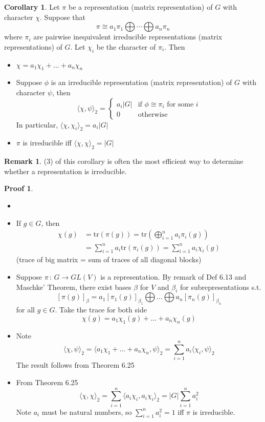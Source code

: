 \documentclass{book}
\newcommand{\inner}[1]{\langle #1 \rangle}
\newcommand{\abs}[1]{\lvert #1 \rvert }
\newcommand{\tr}[1]{\textrm{tr}( #1 )}
\theoremstyle{definition}
\newtheorem{corollary}[lemma]{Corollary}
\theoremstyle{remarkstyle}
\newtheorem*{remark}{Remark}%
\newtheorem*{myproof}{Proof}%
\begin{document}
\begin{corollary}
    Let $\pi$ be a representation (matrix representation) of $G$ with character $\chi$. Suppose that 
    $$
    \pi \cong a_1\pi_1 \bigoplus \cdots \bigoplus a_n\pi_n
    $$
    where $\pi_i$ are pairwise inequivalent irreducible representations (matrix representations) of $G$. Let $\chi_i$ be the character of $\pi_i$. Then 
    \begin{itemize}
        \item $\chi=a_1\chi_1+\dots+a_n\chi_n$
        \item Suppose $\phi$ is an irreducible representation (matrix representation) of $G$ with character $\psi$, then 
        $$
        \inner{\chi,\psi}_2 = \left\{
        \begin{array}{ll}
            a_i\abs{G} & \textrm{if $\phi\cong\pi_i$ for some $i$}  \\
            0 & \textrm{otherwise} 
        \end{array}
        \right.
        $$
        In particular, $\inner{\chi,\chi_i}_2=a_i\abs{G}$
        \item $\pi$ is irreducible iff $\inner{\chi,\chi}_2=\abs{G}$
    \end{itemize}
\end{corollary}
\begin{remark}
    (3) of this corollary is often the most efficient way to determine whether a representation is irreducible.
\end{remark}
\begin{myproof}
    \begin{itemize}
        \item[]
        \item If $g\in G$, then 
        \begin{align*}
            \chi(g) &= \tr{\pi(g)} = \tr{\bigoplus^{n}_{i=1}a_i\pi_i(g)} \\
            &= \sum_{i=1}^{n}a_i\tr{\pi_i(g)} = \sum_{i=1}^{n}a_i\chi_i(g)
        \end{align*}
        (trace of big matrix = sum of traces of all diagonal blocks)
        \item Suppose $\pi\,:\,G\rightarrow GL(V)$ is a representation. By remark of Def 6.13 and Maschke' Theorem, there exist bases $\beta$ for $V$ and $\beta_i$ for subrepresentations s.t. 
        $$
        [\pi(g)]_\beta = a_1[\pi_1(g)]_{\beta_1} \bigoplus \dots \bigoplus a_n[\pi_n(g)]_{\beta_n}
        $$
        for all $g\in G$. Take the trace for both side 
        $$
        \chi(g) = a_1\chi_1(g) + \dots + a_n\chi_n(g)
        $$
        \item Note 
        $$
        \inner{\chi,\psi}_2 = \inner{a_1\chi_1+\dots+a_n\chi_n,\psi}_2 = \sum_{i=1}^{n}a_i\inner{\chi_i,\psi}_2
        $$
        The result follows from Theorem 6.25
        \item From Theorem 6.25
        $$
        \inner{\chi,\chi}_2 = \sum_{i=1}^{n} \inner{a_i\chi_i,a_i\chi_i}_2 = \abs{G}\sum^{n}_{i=1}a^2_i
        $$
        Note $a_i$ must be natural numbers, so $\sum^{n}_{i=1}a^2_i=1$ iff $\pi$ is irreducible. \newline
    \end{itemize}
\end{myproof}
\end{document}
